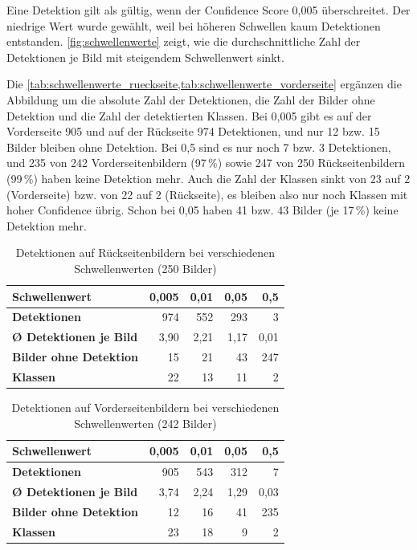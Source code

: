 Eine Detektion gilt als gültig, wenn der Confidence Score 0,005 überschreitet. Der niedrige Wert wurde gewählt, weil bei höheren Schwellen kaum Detektionen entstanden. \cref{fig:schwellenwerte} zeigt, wie die durchschnittliche Zahl der Detektionen je Bild mit steigendem Schwellenwert sinkt.



\noindent Die \cref{tab:schwellenwerte_rueckseite,tab:schwellenwerte_vorderseite} ergänzen die Abbildung um die absolute Zahl der Detektionen, die Zahl der Bilder ohne Detektion und die Zahl der detektierten Klassen. Bei 0,005 gibt es auf der Vorderseite 905 und auf der Rückseite 974 Detektionen, und nur 12 bzw. 15 Bilder bleiben ohne Detektion. Bei 0,5 sind es nur noch 7 bzw. 3 Detektionen, und 235 von 242 Vorderseitenbildern (97\,\%) sowie 247 von 250 Rückseitenbildern (99\,\%) haben keine Detektion mehr. Auch die Zahl der Klassen sinkt von 23 auf 2 (Vorderseite) bzw. von 22 auf 2 (Rückseite), es bleiben also nur noch Klassen mit hoher Confidence übrig. Schon bei 0,05 haben 41 bzw. 43 Bilder (je 17\,\%) keine Detektion mehr.

\begin{table}[H]
\centering
\caption{Detektionen auf Rückseitenbildern bei verschiedenen Schwellenwerten (250 Bilder)}
\label{tab:schwellenwerte_rueckseite}
\begin{tabular}{|l|r|r|r|r|}
\hline
\textbf{Schwellenwert}         & 0{,}005 & 0{,}01 & 0{,}05 & 0{,}5  \\ \hline
\textbf{Detektionen}           & 974     & 552    & 293    & 3      \\ \hline
\textbf{Ø Detektionen je Bild}             & 3{,}90  & 2{,}21 & 1{,}17 & 0{,}01 \\ \hline
\textbf{Bilder ohne Detektion} & 15      & 21     & 43     & 247    \\ \hline
\textbf{Klassen}               & 22      & 13     & 11      & 2      \\ \hline
\end{tabular}
\end{table}

\begin{table}[H]
\centering
\caption{Detektionen auf Vorderseitenbildern bei verschiedenen Schwellenwerten (242 Bilder)}
\label{tab:schwellenwerte_vorderseite}
\begin{tabular}{|l|r|r|r|r|}
\hline
\textbf{Schwellenwert}         & 0{,}005 & 0{,}01 & 0{,}05 & 0{,}5  \\ \hline
\textbf{Detektionen}           & 905     & 543    & 312    & 7      \\ \hline
\textbf{Ø Detektionen je Bild}             & 3{,}74  & 2{,}24 & 1{,}29 & 0{,}03 \\ \hline
\textbf{Bilder ohne Detektion} & 12      & 16     & 41     & 235    \\ \hline
\textbf{Klassen}               & 23      & 18     & 9      & 2      \\ \hline
\end{tabular}
\end{table}

